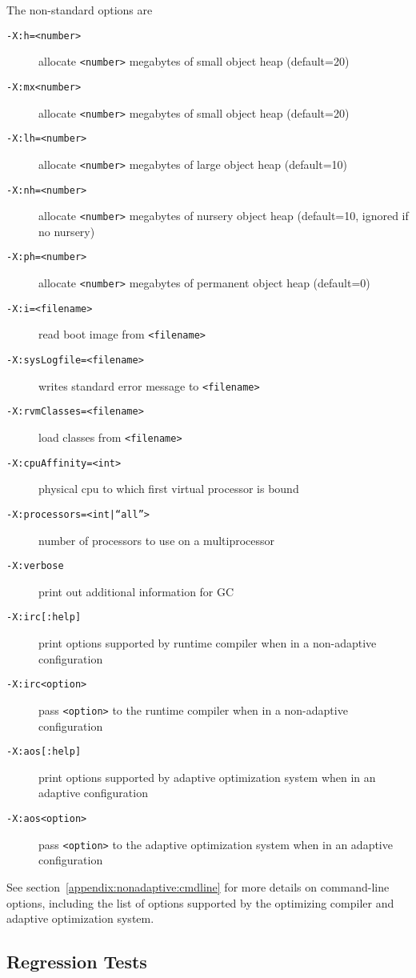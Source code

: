 The non-standard options are

\begin{description}
\item[{\tt -X:h=<number>}]
allocate {\tt <number>} megabytes of small object heap (default=20)

\item[{\tt -X:mx<number>}]
allocate {\tt <number>} megabytes of small object heap (default=20)

\item[{\tt -X:lh=<number>}]
allocate {\tt <number>} megabytes of large object heap (default=10)

\item[{\tt -X:nh=<number>}]
allocate {\tt <number>} megabytes of nursery object heap (default=10,
ignored if no nursery)

\item[{\tt -X:ph=<number>}]
allocate {\tt <number>} megabytes of permanent object heap (default=0)

\item[{\tt -X:i=<filename>}]
read boot image from {\tt <filename>}

\item[{\tt -X:sysLogfile=<filename>}]
writes standard error message to {\tt <filename>}

\item[{\tt -X:rvmClasses=<filename>}]
load classes from {\tt <filename>}

\item[{\tt -X:cpuAffinity=<int>}]
physical cpu to which first virtual processor is bound

\item[{\tt -X:processors=<int|``all''>}]
number of processors to use on a multiprocessor

\item[{\tt -X:verbose}]
print out additional information for GC

\item[{\tt -X:irc[:help]}]
print options supported by runtime compiler when in a non-adaptive configuration 

\item[{\tt -X:irc<option>}]
pass {\tt <option>} to the runtime compiler when in a non-adaptive configuration 

\item[{\tt -X:aos[:help]}]
print options supported by adaptive optimization system when in an
adaptive configuration

\item[{\tt -X:aos<option>}]
pass {\tt <option>} to the adaptive optimization system when in an adaptive configuration

\end{description}

See section~\ref{appendix:nonadaptive:cmdline} for more details on 
command-line options, including the list of options supported by the 
optimizing compiler and adaptive optimization system.


\subsection{Regression Tests}

